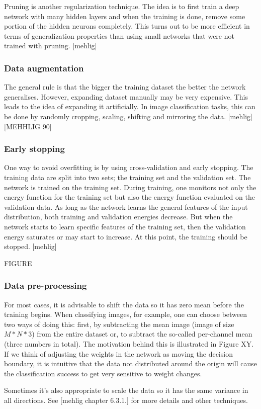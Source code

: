 Pruning is another regularization technique. The idea is to first train a deep network with many hidden layers and when the training is done, remove some portion of the hidden neurons completely. This turns out to be more efficient in terms of generalization properties than using small networks that were not trained with pruning. [mehlig]

\subsubsection{Data augmentation}

The general rule is that the bigger the training dataset the better the network generalises. However, expanding dataset manually may be very expensive. This leads to the idea of expanding it artificially. In image classification tasks, this can be done by randomly cropping, scaling, shifting and mirroring the data. [mehlig]
[MEHHLIG 90]

\subsubsection{Early stopping}
One way to avoid overfitting is by using cross-validation and early stopping. The training data are split into two sets; the training set and the validation set. The network is trained on the training set. During training, one monitors not only the energy function for the training set but also the energy function evaluated on the validation data. As long as the network learns the general features of the input distribution, both training and validation energies decrease. But when the network starts to learn specific features of the training set, then the validation energy saturates or may start to increase. At this point, the training should be stopped. [mehlig]

FIGURE

\subsubsection{Data pre-processing}

For most cases, it is advisable to shift the data so it has zero mean before the training begins. When classifying images, for example, one can choose between two ways of doing this: first, by subtracting the mean image (image of size $ M*N*3 $) from the entire dataset or, to subtract the so-called per-channel mean (three numbers in total). The motivation behind this is illustrated in Figure XY. If we think of adjusting the weights in the network as moving the decision boundary, it is intuitive that the data not distributed around the origin will cause the classification success to get very sensitive to weight changes.

Sometimes it's also appropriate to scale the data so it has the same variance in all directions. See [mehlig chapter 6.3.1.] for more details and other techniques.






